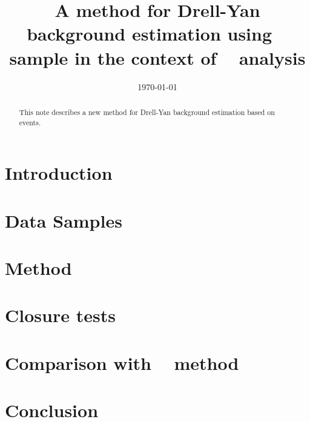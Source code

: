 \documentclass{cmspaper}
\begin{document}
\begin{titlepage}


  \date{\today}

  \title{A method for Drell-Yan background estimation using \gjets~ sample in the context of \hww~ analysis}
  
  

  \begin{abstract}
    This note describes a new method for Drell-Yan background estimation based on \gjets~ events.
  \end{abstract} 

\end{titlepage}
\tableofcontents
\listoftables
\listoffigures
\newpage 

\section{Introduction}
   \label{sec:introduction}
   
\section{Data Samples}
  \label{sec:datasets}
  
\section{Method}
   \label{sec:method}
   
\section{Closure tests}
   \label{sec:closure}
   
\section{Comparison with \routin~ method}
   \label{sec:comparison}
   
\section{Conclusion}
   
\clearpage

\end{document}
